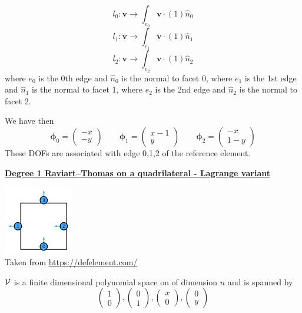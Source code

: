 \[
l_0: {\bm v} \rightarrow \int_{e_0} {\bm v} \cdot (1) \hat{n}_0
\]
\[
l_1: {\bm v} \rightarrow \int_{e_1} {\bm v} \cdot (1) \hat{n}_1
\]
\[
l_2: {\bm v} \rightarrow \int_{e_2} {\bm v} \cdot (1) \hat{n}_2
\]
where $e_0$ is the 0th edge and $\hat{n}_0$ is the normal to facet 0,
where $e_1$ is the 1st edge and $\hat{n}_1$ is the normal to facet 1,
where $e_2$ is the 2nd edge and $\hat{n}_2$ is the normal to facet 2.

We have then
\[
{\bm \phi}_0 = \left( \begin{array}{c} -x\\-y  \end{array} \right)
\qquad
{\bm \phi}_1 = \left( \begin{array}{c} x-1\\y  \end{array} \right)
\qquad
{\bm \phi}_2 = \left( \begin{array}{c} -x \\ 1-y  \end{array} \right)
\]
These DOFs are associated with edge 0,1,2 of the reference element.




\noindent
\underline{\bf Degree 1 Raviart–Thomas on a quadrilateral - Lagrange variant}

\begin{center}
\includegraphics[width=3cm]{images/pair_raviart-thomas/element-NCF-variant-equispaced-quadrilateral-1-dofs}\\
{\captionfont Taken from \url{https://defelement.com/}}
\end{center}

${\cal V}$ is a finite dimensional polynomial space on of dimension $n$ and is spanned by 
\[
\left( \begin{array}{c}1 \\ 0  \end{array} \right),
\left( \begin{array}{c}0 \\ 1  \end{array} \right),
\left( \begin{array}{c}x \\ 0  \end{array} \right),
\left( \begin{array}{c}0 \\ y  \end{array} \right)
\]

